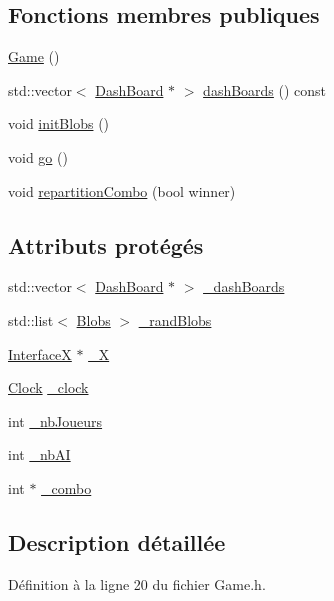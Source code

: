 \subsection*{Fonctions membres publiques}
\begin{DoxyCompactItemize}
\item 
\hyperlink{a00008_ad59df6562a58a614fda24622d3715b65}{Game} ()
\item 
std::vector$<$ \hyperlink{a00006}{DashBoard} $\ast$ $>$ \hyperlink{a00008_acbd25b2f9ebf42969ca1bbbed11e2278}{dashBoards} () const 
\item 
void \hyperlink{a00008_ac776a53b458aefe8f9fcd747cbd9f017}{initBlobs} ()
\item 
void \hyperlink{a00008_ab411d0da584724addd4fdb96fc16b9a4}{go} ()
\item 
void \hyperlink{a00008_a5be594f7665ef28f1c1c45a13cbc329c}{repartitionCombo} (bool winner)
\end{DoxyCompactItemize}
\subsection*{Attributs protégés}
\begin{DoxyCompactItemize}
\item 
std::vector$<$ \hyperlink{a00006}{DashBoard} $\ast$ $>$ \hyperlink{a00008_a45fee55be795271d23513ebea986e77e}{\_\-dashBoards}
\item 
std::list$<$ \hyperlink{a00002}{Blobs} $>$ \hyperlink{a00008_a33bcc74459901d064c807acff9c9526a}{\_\-randBlobs}
\item 
\hyperlink{a00011}{InterfaceX} $\ast$ \hyperlink{a00008_aa1772649a588646ef4e1a131e94d05b1}{\_\-X}
\item 
\hyperlink{a00003}{Clock} \hyperlink{a00008_a7417ed7ba1bbd0bd367ce7e727236eb6}{\_\-clock}
\item 
int \hyperlink{a00008_a44492b721749d5d05a7a28842af710a8}{\_\-nbJoueurs}
\item 
int \hyperlink{a00008_a4c0eee968b713100c74cde5aa6e984e0}{\_\-nbAI}
\item 
int $\ast$ \hyperlink{a00008_a767c9632e60bc307680766395ecb9b1b}{\_\-combo}
\end{DoxyCompactItemize}


\subsection{Description détaillée}


Définition à la ligne 20 du fichier Game.h.



